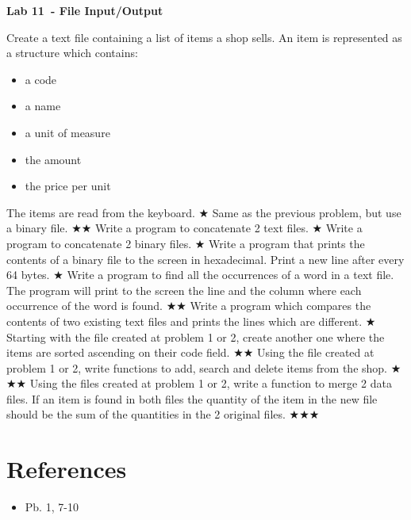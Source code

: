 \documentclass{exam}
\newcommand\labnr{11}
\newcommand\lab{Lab \labnr\ - File Input/Output}
\newcommand\lvlez{$\bigstar$}
\newcommand\lvlmed{\lvlez\lvlez}
\newcommand\lvlhard{\lvlmed\lvlez}
\begin{document}
\begin{center}
   \vspace*{0cm}
   \bfseries\LARGE
   \lab
   \vspace*{1cm}
\end{center}

\begin{questions}
   \question  Create a text file containing a list of items a shop sells. An item is represented as a structure which
contains:
   \begin{itemize}
      \item a code
      \item a name
      \item a unit of measure
      \item the amount
      \item the price per unit
   \end{itemize} 
   The items are read from the keyboard. \lvlez
   \question Same as the previous problem, but use a binary file. \lvlmed
   \question Write a program to concatenate 2 text files. \lvlez
   \question Write a program to concatenate 2 binary files. \lvlez
   \question Write a program that prints the contents of a binary file to the screen in hexadecimal. Print a new line after every 64 bytes. \lvlez
   \question Write a program to find all the occurrences of a word in a text file. The program will print to the screen the line and the column where each occurrence of the word is found. \lvlmed
   \question Write a program which compares the contents of two existing text files and prints the lines which are different. \lvlez
   \question Starting with the file created at problem 1 or 2, create another one where the items are sorted ascending on their code field. \lvlmed
   \question Using the file created at problem 1 or 2, write functions to add, search and delete items from the shop. \lvlhard
   \question Using the files created at problem 1 or 2, write a function to merge 2 data files. If an item is found in both files the quantity of the item in the new file should be the sum of the quantities in the 2 original files. \lvlhard
\end{questions}
\medskip
\section*{References}
\begin{itemize}
   \item Pb. 1, 7-10 \cite{cplab11}
\end{itemize}
\printbibliography[heading=none]
\end{document}
